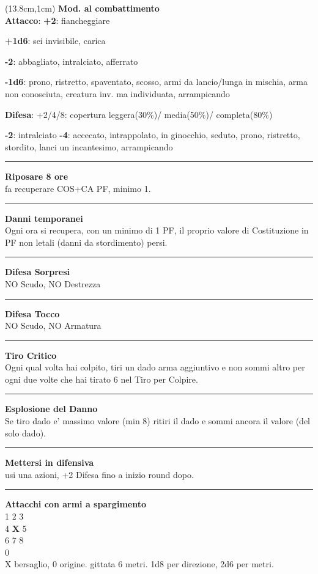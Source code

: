 \documentclass[a4paper,12 pt,openany]{book}
\newcommand{\riga}{\rule{\textwidth}{0.4pt}}
\begin{document}
\begin{textblock*}{6.2cm}(13.8cm,1cm) %
\textbf{Mod. al combattimento}\\
\textbf{Attacco}:
\textbf{+2}: fiancheggiare

\textbf{+1d6}: sei invisibile, carica

\textbf{-2}: abbagliato, intralciato, afferrato

\textbf{-1d6}: prono, ristretto, spaventato, scosso, armi da lancio/lunga in mischia, arma non conosciuta, creatura inv. ma individuata, arrampicando

\textbf{Difesa}: +2/4/8: copertura leggera(30\%)/ media(50\%)/ completa(80\%)

\textbf{-2}: intralciato \textbf{-4}: accecato, intrappolato, in ginocchio, seduto, prono, ristretto, stordito, lanci un incantesimo, arrampicando
\riga

\textbf{Riposare 8 ore} \\fa recuperare COS+CA PF, minimo 1.

\riga

\textbf{Danni temporanei}\\ Ogni ora si recupera, con un minimo di 1 PF, il proprio valore di Costituzione in PF non letali (danni da stordimento) persi.

\riga

\textbf{Difesa Sorpresi}\\NO Scudo, NO Destrezza

\riga

\textbf{Difesa Tocco}\\ NO Scudo, NO Armatura

\riga

\textbf{Tiro Critico}\\
Ogni qual volta hai colpito, tiri un dado arma aggiuntivo e non sommi altro per ogni due volte che hai tirato 6 nel Tiro per Colpire.

\riga

\textbf{Esplosione del Danno}\\
Se tiro dado e' massimo valore (min 8) ritiri il dado e sommi ancora il valore (del solo dado).

\riga

\textbf{Mettersi in difensiva}\\
usi una azioni, +2 Difesa fino a inizio round dopo.


\riga

\textbf{Attacchi con armi a spargimento}\\
		1 2 3\\
		4 \textbf{X} 5\\
		6 7 8\\
		0\\
		X bersaglio, 0 origine. gittata 6 metri. 1d8 per direzione, 2d6 per metri.


\end{textblock*}
\end{document}
